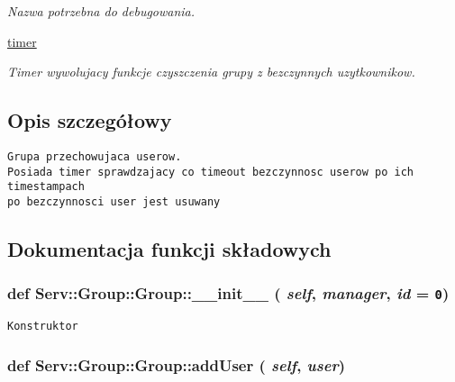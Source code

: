 \begin{CompactItemize}
\begin{CompactList}\small\item\em Nazwa potrzebna do debugowania. \item\end{CompactList}\item 
\hypertarget{class_serv_1_1_group_1_1_group_f32cede000e34bd216170b4969c2e938}{
\hyperlink{class_serv_1_1_group_1_1_group_f32cede000e34bd216170b4969c2e938}{timer}}
\label{class_serv_1_1_group_1_1_group_f32cede000e34bd216170b4969c2e938}

\begin{CompactList}\small\item\em Timer wywolujacy funkcje czyszczenia grupy z bezczynnych uzytkownikow. \item\end{CompactList}\end{CompactItemize}


\subsection{Opis szczegółowy}


\footnotesize\begin{verbatim}Grupa przechowujaca userow.
Posiada timer sprawdzajacy co timeout bezczynnosc userow po ich timestampach
po bezczynnosci user jest usuwany    
\end{verbatim}
\normalsize
 

\subsection{Dokumentacja funkcji składowych}
\hypertarget{class_serv_1_1_group_1_1_group_ee5bd24c2c39d9c06c11aec410690c3d}{
\subsubsection[{\_\-\_\-init\_\-\_\-}]{\setlength{\rightskip}{0pt plus 5cm}def Serv::Group::Group::\_\-\_\-init\_\-\_\- ( {\em self}, \/   {\em manager}, \/   {\em id} = {\tt 0})}}
\label{class_serv_1_1_group_1_1_group_ee5bd24c2c39d9c06c11aec410690c3d}




\footnotesize\begin{verbatim}Konstruktor\end{verbatim}
\normalsize
 \hypertarget{class_serv_1_1_group_1_1_group_0a4183d2362794bd55741a35e4b5a91d}{
\subsubsection[{addUser}]{\setlength{\rightskip}{0pt plus 5cm}def Serv::Group::Group::addUser ( {\em self}, \/   {\em user})}}
\label{class_serv_1_1_group_1_1_group_0a4183d2362794bd55741a35e4b5a91d}




